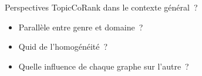 
  \begin{frame}{Perspectives}
    TopicCoRank dans le contexte général~?
    \begin{itemize}
      \item{Parallèle entre genre et domaine~?}
      \item{Quid de l'homogénéité~?}
      \item{Quelle influence de chaque graphe sur l'autre~?}
    \end{itemize}
  \end{frame}

